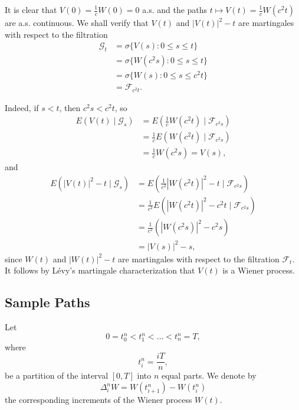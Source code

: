 \begin{Solution}
It is clear that $V(0) = \frac{1}{c} W(0) = 0$ a.s. and the paths $t \mapsto V(t) = \frac{1}{c} W(c^2 t)$ are a.s. continuous. We shall verify that $V(t)$ and $|V(t)|^2 - t$ are martingales with respect to the filtration
\begin{equation}
\begin{aligned}
\mathcal{G}_t &= \sigma\{V(s): 0 \leq s \leq t\} \\
&= \sigma\{W(c^2 s): 0 \leq s \leq t\} \\
&= \sigma\{W(s): 0 \leq s \leq c^2 t\} \\
&= \mathcal{F}_{c^2 t}.
\end{aligned}
\end{equation}

Indeed, if $s < t$, then $c^2 s < c^2 t$, so
\begin{equation}
\begin{aligned}
E(V(t) \mid \mathcal{G}_s) &= E\left(\frac{1}{c} W(c^2 t) \mid \mathcal{F}_{c^2 s}\right) \\
&= \frac{1}{c} E\left(W(c^2 t) \mid \mathcal{F}_{c^2 s}\right) \\
&= \frac{1}{c} W(c^2 s) = V(s),
\end{aligned}
\end{equation}
and
\begin{equation}
\begin{aligned}
E(|V(t)|^2 - t \mid \mathcal{G}_s) &= E\left(\frac{1}{c^2} |W(c^2 t)|^2 - t \mid \mathcal{F}_{c^2 s}\right) \\
&= \frac{1}{c^2} E(|W(c^2 t)|^2 - c^2 t \mid \mathcal{F}_{c^2 s}) \\
&= \frac{1}{c^2}(|W(c^2 s)|^2 - c^2 s) \\
&= |V(s)|^2 - s,
\end{aligned}
\end{equation}
since $W(t)$ and $|W(t)|^2 - t$ are martingales with respect to the filtration $\mathcal{F}_t$. It follows by Lévy's martingale characterization that $V(t)$ is a Wiener process.
\end{Solution}

\subsection{Sample Paths}
\label{sec:brownian-sample-paths}

Let
\[
0 = t_0^n < t_1^n < \dots < t_n^n = T,
\]
where
\[
t_i^n = \frac{iT}{n},
\]
be a partition of the interval $[0, T]$ into $n$ equal parts. We denote by
\[
\Delta_i^n W = W(t_{i+1}^n) - W(t_i^n)
\]
the corresponding increments of the Wiener process $W(t)$.

